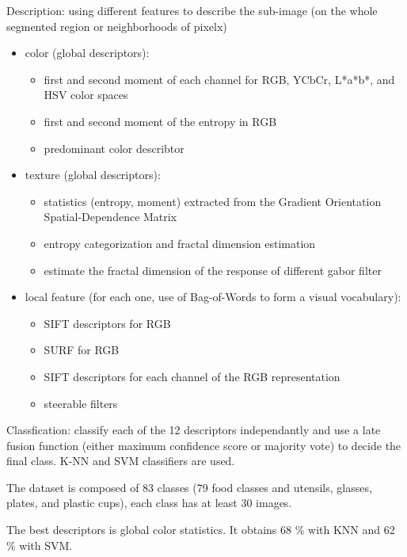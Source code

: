 Description: using different features to describe the sub-image (on the whole segmented region or neighborhoods of pixelx)
\begin{itemize}
    \item color (global descriptors):
    \begin{itemize}
        \item first and second moment of each channel for RGB, YCbCr, L*a*b*, and HSV color spaces
        \item first and second moment of the entropy in RGB
        \item predominant color describtor
    \end{itemize}
    
    \item texture (global descriptors):
    \begin{itemize}
        \item statistics (entropy, moment) extracted from the Gradient Orientation Spatial-Dependence Matrix
        \item entropy categorization and fractal dimension estimation
        \item estimate the fractal dimension of the response of different gabor filter
    \end{itemize}
    
    \item local feature (for each one, use of Bag-of-Words to form a visual vocabulary):
    \begin{itemize}
        \item SIFT descriptors for RGB
        \item SURF for RGB
        \item SIFT descriptors for each channel of the RGB representation
        \item steerable filters
    \end{itemize}
\end{itemize}

Classfication: classify each of the 12 descriptors independantly and use a late fusion function (either maximum confidence score or majority vote) to decide the final class. K-NN and SVM classifiers are used.

The dataset is composed of 83 classes (79 food classes and utensils, glasses, plates, and plastic cups), each class has at least 30 images.

The best descriptors is global color statistics. It obtains 68 \% with KNN and 62 \% with SVM.


